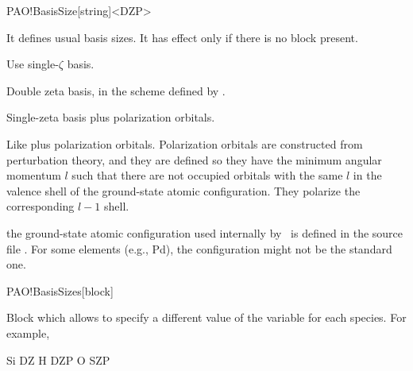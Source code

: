 \begin{fdfentry}{PAO!BasisSize}[string]<DZP>

  It defines usual basis sizes. It has effect only if there is no
  block  present.

  \begin{fdfoptions}

    \option[SZ|minimal]%

    Use single-$\zeta$ basis.


    \option[DZ]%

    Double zeta basis, in the scheme defined by .


    \option[SZP]%

    Single-zeta basis plus polarization orbitals.

    
    
    Like  plus polarization orbitals. Polarization orbitals
    are constructed from perturbation theory, and they are defined so they
    have the minimum angular momentum $l$
    such that there are not occupied orbitals with the same $l$ in the
    valence shell of the ground-state atomic configuration. They
    polarize the corresponding $l-1$ shell.

    \note the ground-state atomic configuration used internally by
    \siesta\ is defined in the source file
    .  For some elements (e.g., Pd), the
    configuration might not be the standard one.
    
  \end{fdfoptions}

\end{fdfentry}


\begin{fdfentry}{PAO!BasisSizes}[block]

  Block which allows to specify a different value of the variable
   for each species. For example,
  \begin{fdfexample}
         Si      DZ
         H       DZP
         O       SZP
  \end{fdfexample}
  
\end{fdfentry}



